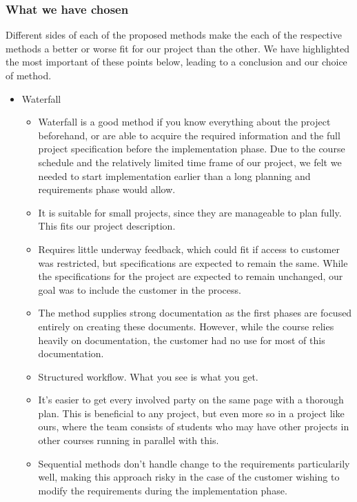 \subsubsection{What we have chosen}
Different sides of each of the proposed methods make the each of the respective methods a better or worse fit for our project than the other. We have highlighted the most important of these points below, leading to a conclusion and our choice of method.
\begin{itemize}
	\item Waterfall
	\begin{itemize}
		\item Waterfall is a good method if you know everything about the project beforehand, or are able to acquire the required information and the full project specification before the implementation phase. Due to the course schedule and the relatively limited time frame of our project, we felt we needed to start implementation earlier than a long planning and requirements phase would allow.
		\item It is suitable for small projects, since they are manageable to plan fully. This fits our project description.
		\item Requires little underway feedback, which could fit if access to customer was restricted, but specifications are expected to remain the same. While the specifications for the project are expected to remain unchanged, our goal was to include the customer in the process.
		\item The method supplies strong documentation as the first phases are focused entirely on creating these documents. However, while the course relies heavily on documentation, the customer had no use for most of this documentation.
		\item Structured workflow. What you see is what you get. %
		\item It's easier to get every involved party on the same page with a thorough plan. This is beneficial to any project, but even more so in a project like ours, where the team consists of students who may have other projects in other courses running in parallel with this.
		\item Sequential methods don't handle change to the requirements particularily well, making this approach risky in the case of the customer wishing to modify the requirements during the implementation phase.
	\end{itemize}
\end{itemize}
